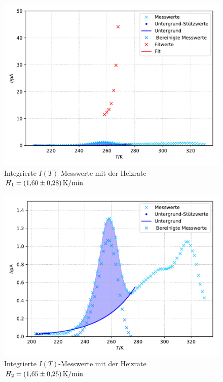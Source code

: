 \begin{figure}[H]
  \centering
  \includegraphics[scale=0.75]{content/plot3.pdf}
  \caption{Integrierte $I(T)$-Messwerte mit der Heizrate $H_1 = \SI{1.60 +- 0.28}{\kelvin\per\minute}$}
  \label{fig:plot3}
\end{figure}

\begin{figure}[H]
  \centering
  \includegraphics[scale=0.75]{content/plot4.pdf}
  \caption{Integrierte $I(T)$-Messwerte mit der Heizrate $H_2 = \SI{1.65 +- 0.25}{\kelvin\per\minute}$}
  \label{fig:plot4}
\end{figure}


